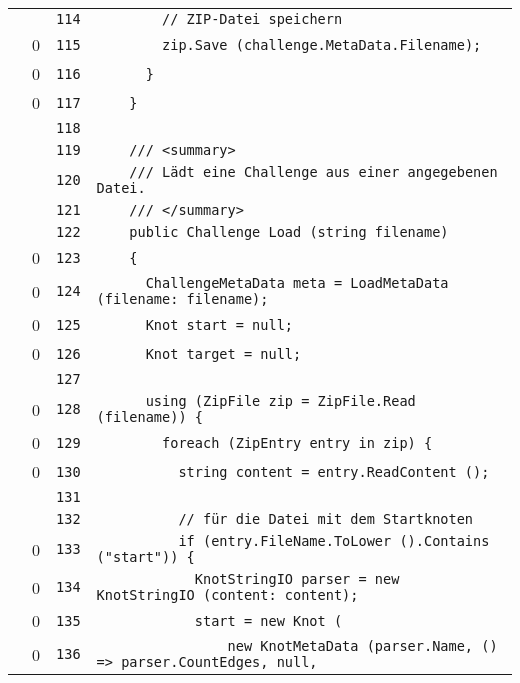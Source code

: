 \documentclass[a4paper,10pt]{article}
\begin{document}
\begin{longtable}[l]{lrrl}
\cellcolor{gray} &  & \verb~114~ & \verb~        // ZIP-Datei speichern~\\
\cellcolor{red} & 0 & \verb~115~ & \verb~        zip.Save (challenge.MetaData.Filename);~\\
\cellcolor{red} & 0 & \verb~116~ & \verb~      }~\\
\cellcolor{red} & 0 & \verb~117~ & \verb~    }~\\
\cellcolor{gray} &  & \verb~118~ & \verb~~\\
\cellcolor{gray} &  & \verb~119~ & \verb~    /// <summary>~\\
\cellcolor{gray} &  & \verb~120~ & \verb~    /// Lädt eine Challenge aus einer angegebenen Datei.~\\
\cellcolor{gray} &  & \verb~121~ & \verb~    /// </summary>~\\
\cellcolor{gray} &  & \verb~122~ & \verb~    public Challenge Load (string filename)~\\
\cellcolor{red} & 0 & \verb~123~ & \verb~    {~\\
\cellcolor{red} & 0 & \verb~124~ & \verb~      ChallengeMetaData meta = LoadMetaData (filename: filename);~\\
\cellcolor{red} & 0 & \verb~125~ & \verb~      Knot start = null;~\\
\cellcolor{red} & 0 & \verb~126~ & \verb~      Knot target = null;~\\
\cellcolor{gray} &  & \verb~127~ & \verb~~\\
\cellcolor{red} & 0 & \verb~128~ & \verb~      using (ZipFile zip = ZipFile.Read (filename)) {~\\
\cellcolor{red} & 0 & \verb~129~ & \verb~        foreach (ZipEntry entry in zip) {~\\
\cellcolor{red} & 0 & \verb~130~ & \verb~          string content = entry.ReadContent ();~\\
\cellcolor{gray} &  & \verb~131~ & \verb~~\\
\cellcolor{gray} &  & \verb~132~ & \verb~          // für die Datei mit dem Startknoten~\\
\cellcolor{red} & 0 & \verb~133~ & \verb~          if (entry.FileName.ToLower ().Contains ("start")) {~\\
\cellcolor{red} & 0 & \verb~134~ & \verb~            KnotStringIO parser = new KnotStringIO (content: content);~\\
\cellcolor{red} & 0 & \verb~135~ & \verb~            start = new Knot (~\\
\cellcolor{red} & 0 & \verb~136~ & \verb~                new KnotMetaData (parser.Name, () => parser.CountEdges, null, ~\\

\end{longtable}
\end{document}
